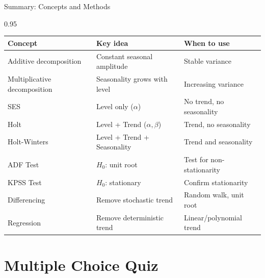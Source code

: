 \documentclass[9pt, aspectratio=169, t]{beamer}
\begin{document}
\begin{frame}{Summary: Concepts and Methods}
    \begin{cminipage}{0.95\textwidth}
    \begin{center}
    \small
    \begin{tabular}{lll}
        \toprule
        \textbf{Concept} & \textbf{Key idea} & \textbf{When to use} \\
        \midrule
        Additive decomposition & Constant seasonal amplitude & Stable variance \\
        Multiplicative decomposition & Seasonality grows with level & Increasing variance \\
        SES & Level only ($\alpha$) & No trend, no seasonality \\
        Holt & Level + Trend ($\alpha, \beta$) & Trend, no seasonality \\
        Holt-Winters & Level + Trend + Seasonality & Trend and seasonality \\
        \midrule
        ADF Test & $H_0$: unit root & Test for non-stationarity \\
        KPSS Test & $H_0$: stationary & Confirm stationarity \\
        \midrule
        Differencing & Remove stochastic trend & Random walk, unit root \\
        Regression & Remove deterministic trend & Linear/polynomial trend \\
        \bottomrule
    \end{tabular}
    \end{center}
    \end{cminipage}
\end{frame}

\section{Multiple Choice Quiz}
\end{document}
